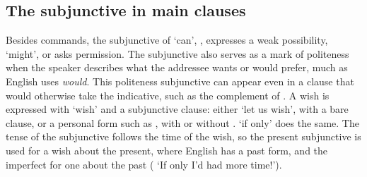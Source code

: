\subsection{The subjunctive in main clauses}\label{sec:sbjv-main}
Besides commands, the subjunctive of  `can', , expresses a weak possibility, `might', or asks permission.
The subjunctive also serves as a mark of politeness when the speaker describes what the addressee wants or would prefer, much as English uses \textit{would}. This politeness subjunctive can appear even in a clause that would otherwise take the indicative, such as the complement of .
A wish is expressed with  `wish' and a subjunctive clause: either  `let us wish', with a bare clause, or a personal form such as , with or without .  `if only' does the same. The tense of the subjunctive follows the time of the wish, so the present subjunctive is used for a wish about the present, where English has a past form, and the imperfect for one about the past ( `If only I'd had more time!').

